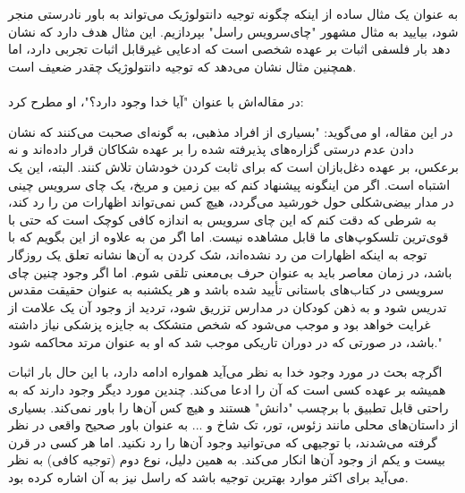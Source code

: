 \documentclass[10pt,a4paper]{article}
\begin{document}
                    \\
                    \\
                    به عنوان یک مثال ساده از اینکه چگونه توجیه دانتولوژیک می‌تواند به باور نادرستی منجر شود، بیایید به مثال مشهور "چای‌سرویس راسل" بپردازیم. این مثال هدف دارد که نشان دهد بار فلسفی اثبات بر عهده شخصی است که ادعایی غیرقابل اثبات تجربی دارد، اما همچنین مثال نشان می‌دهد که توجیه دانتولوژیک چقدر ضعیف است.\cite{enwiki:1149010951}
                    \\
                    \\
                    در مقاله‌اش با عنوان "آیا خدا وجود دارد؟"، او مطرح کرد:
                    \begin{qt}
                       در این مقاله، او می‌گوید: "بسیاری از افراد مذهبی، به گونه‌ای صحبت می‌کنند که نشان دادن عدم درستی گزاره‌های پذیرفته شده را بر عهده شکاکان قرار داده‌اند و نه برعکس، بر عهده دغل‌بازان است که برای ثابت کردن خودشان تلاش کنند. البته، این یک اشتباه است. اگر من اینگونه پیشنهاد کنم که بین زمین و مریخ، یک چای سرویس چینی در مدار بیضی‌شکلی حول خورشید می‌گردد، هیچ کس نمی‌تواند اظهارات من را رد کند، به شرطی که دقت کنم که این چای سرویس به اندازه کافی کوچک است که حتی با قوی‌ترین تلسکوپ‌های ما قابل مشاهده نیست. اما اگر من به علاوه از این بگویم که با توجه به اینکه اظهارات من رد نشده‌اند، شک کردن به آن‌ها نشانه تعلق یک روزگار باشد، در زمان معاصر باید به عنوان حرف بی‌معنی تلقی شوم. اما اگر وجود چنین چای سرویسی در کتاب‌های باستانی تأیید شده باشد و هر یکشنبه به عنوان حقیقت مقدس تدریس شود و به ذهن کودکان در مدارس تزریق شود، تردید از وجود آن یک علامت از غرایت خواهد بود و موجب می‌شود که شخص متشکک به جایزه پزشکی نیاز داشته باشد، در صورتی که در دوران تاریکی موجب شد که او به عنوان مرتد محاکمه شود."
                    \end{qt}
                    اگرچه بحث در مورد وجود خدا به نظر می‌آید همواره ادامه دارد، با این حال بار اثبات همیشه بر عهده کسی است که آن را ادعا می‌کند. چندین مورد دیگر وجود دارند که به راحتی قابل تطبیق با برچسب "دانش" هستند و هیچ کس آن‌ها را باور نمی‌کند. بسیاری از داستان‌های محلی مانند زئوس، تور، تک شاخ و ... به عنوان باور صحیح واقعی در نظر گرفته می‌شدند، با توجیهی که می‌توانید وجود آن‌ها را رد نکنید. اما هر کسی در قرن بیست و یکم از وجود آن‌ها انکار می‌کند. به همین دلیل، نوع دوم (توجیه کافی) به نظر می‌آید برای اکثر موارد بهترین توجیه باشد که راسل نیز به آن اشاره کرده بود.\cite{Russell1952}
                    \\
                    \\
\end{document}
